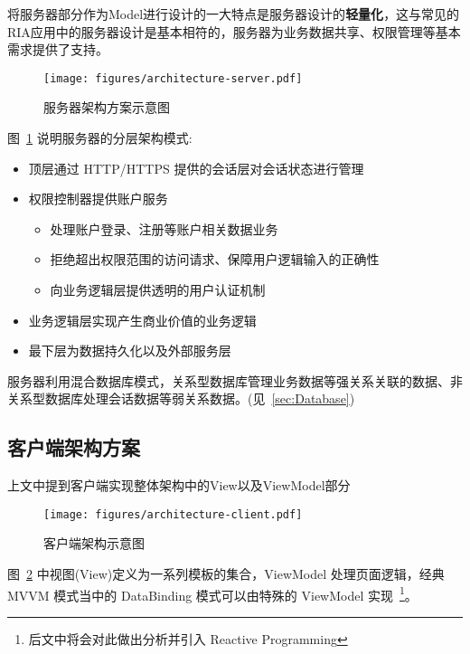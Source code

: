将服务器部分作为Model进行设计的一大特点是服务器设计的\textbf{轻量化}，这与常见的RIA应用中的服务器设计是基本相符的，服务器为业务数据共享、权限管理等基本需求提供了支持。

\begin{figure}[!h]
  \begin{center}
    \texttt{[image: figures/architecture-server.pdf]}
    \caption{服务器架构方案示意图\label{ArchitectureServer}}
  \end{center}
\end{figure}

图~\ref{ArchitectureServer} 说明服务器的分层架构模式:

\begin{itemize}
  \item 顶层通过 HTTP/HTTPS 提供的会话层对会话状态进行管理
  \item 权限控制器提供账户服务
  \begin{itemize}
    \item 处理账户登录、注册等账户相关数据业务
    \item 拒绝超出权限范围的访问请求、保障用户逻辑输入的正确性
    \item 向业务逻辑层提供透明的用户认证机制
  \end{itemize}
  \item 业务逻辑层实现产生商业价值的业务逻辑
  \item 最下层为数据持久化以及外部服务层
\end{itemize}

服务器利用混合数据库模式，关系型数据库管理业务数据等强关系关联的数据、非关系型数据库处理会话数据等弱关系数据。(见~\ref{sec:Database})

\subsection{客户端架构方案}

上文中提到客户端实现整体架构中的View以及ViewModel部分

\begin{figure}[!h]
  \begin{center}
    \texttt{[image: figures/architecture-client.pdf]}
    \caption{客户端架构示意图\label{ArchitectureClient}}
  \end{center}
\end{figure}

图~\ref{ArchitectureClient} 中视图(View)定义为一系列模板的集合，ViewModel 处理页面逻辑，经典 MVVM 模式当中的 DataBinding 模式可以由特殊的 ViewModel 实现~\footnote{后文中将会对此做出分析并引入 Reactive Programming}。

